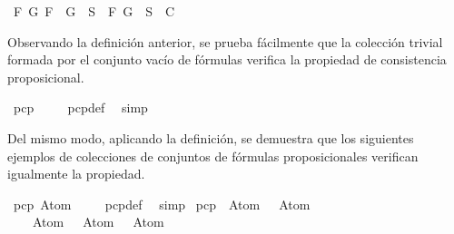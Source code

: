 \begin{isabellebody}
{\isasymand}\ {\isacharparenleft}{\isasymforall}F\ G{\isachardot}\ \isactrlbold {\isasymnot}{\isacharparenleft}F\ \isactrlbold {\isasymrightarrow}\ G{\isacharparenright}\ {\isasymin}\ S\ {\isasymlongrightarrow}\ {\isacharbraceleft}F{\isacharcomma}\isactrlbold {\isasymnot}\ G{\isacharbraceright}\ {\isasymunion}\ S\ {\isasymin}\ C{\isacharparenright}{\isacharparenright}{\isachardoublequoteclose}%
\begin{isamarkuptext}%
Observando la definición anterior, se prueba fácilmente que la colección trivial
  formada por el conjunto vacío de fórmulas verifica la propiedad de consistencia 
  proposicional.%
\end{isamarkuptext}\isamarkuptrue%
\isamarkupfalse%
\ {\isachardoublequoteopen}pcp\ {\isacharbraceleft}{\isacharbraceleft}{\isacharbraceright}{\isacharbraceright}{\isachardoublequoteclose}\isanewline
%
\isadelimproof
\ \ %
\endisadelimproof
%
\isatagproof
{}\isamarkupfalse%
\ pcp{\isacharunderscore}def\ \isamarkupfalse%
\ simp%
\endisatagproof
{\isafoldproof}%
%
\isadelimproof
%
\endisadelimproof
%
\begin{isamarkuptext}%
Del mismo modo, aplicando la definición, se demuestra que los siguientes ejemplos
  de colecciones de conjuntos de fórmulas proposicionales verifican igualmente la 
  propiedad.%
\end{isamarkuptext}\isamarkuptrue%
\isamarkupfalse%
\ {\isachardoublequoteopen}pcp\ {\isacharbraceleft}{\isacharbraceleft}Atom\ {}{\isacharbraceright}{\isacharbraceright}{\isachardoublequoteclose}\isanewline
%
\isadelimproof
\ \ %
\endisadelimproof
%
\isatagproof
{}\isamarkupfalse%
\ pcp{\isacharunderscore}def\ \isamarkupfalse%
\ simp%
\endisatagproof
{\isafoldproof}%
%
\isadelimproof
\isanewline
%
\endisadelimproof
\isanewline
{}\isamarkupfalse%
\ {\isachardoublequoteopen}pcp\ {\isacharbraceleft}{\isacharbraceleft}{\isacharparenleft}\isactrlbold {\isasymnot}\ {\isacharparenleft}Atom\ {}{\isacharparenright}{\isacharparenright}\ \isactrlbold {\isasymrightarrow}\ Atom\ {}{\isacharbraceright}{\isacharcomma}\isanewline
\ \ \ {\isacharbraceleft}{\isacharparenleft}{\isacharparenleft}\isactrlbold {\isasymnot}\ {\isacharparenleft}Atom\ {}{\isacharparenright}{\isacharparenright}\ \isactrlbold {\isasymrightarrow}\ Atom\ {}{\isacharparenright}{\isacharcomma}\ \isactrlbold {\isasymnot}{\isacharparenleft}\isactrlbold {\isasymnot}\ {\isacharparenleft}Atom\ {}{\isacharparenright}{\isacharparenright}{\isacharbraceright}{\isacharcomma}\isanewline

\end{isabellebody}
